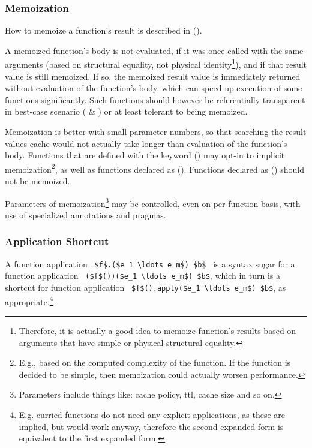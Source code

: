 \subsubsection{Memoization}
\label{sec:memoization}

How to memoize a function's result is described in ().

A memoized function's body is not evaluated, if it was once called with the same arguments (based on structural equality, not physical identity\footnote{Therefore, it is actually a good idea to memoize function's results based on arguments that have simple or physical structural equality.}), and if that result value is still memoized. If so, the memoized result value is immediately returned without evaluation of the function's body, which can speed up execution of some functions significantly. Such functions should however be referentially transparent in best-case scenario ( \& ) or at least tolerant to being memoized. 

Memoization is better with small parameter numbers, so that searching the result values cache would not actually take longer than evaluation of the function's body. Functions that are defined with the  keyword () may opt-in to implicit memoization\footnote{E.g., based on the computed complexity of the function. If the function is decided to be simple, then memoization could actually worsen performance.}, as well as functions declared as  (). Functions declared as  () should not be memoized. 

Parameters of memoization\footnote{Parameters include things like: cache policy, ttl, cache size and so on.} may be controlled, even on per-function basis, with use of specialized annotations and pragmas. 





\subsubsection{Application Shortcut}
\label{sec:function-application-shortcut}

A function application ~\lstinline!$f$.($e_1 \ldots e_m$) $b$!~ is a syntax sugar for a function application ~\lstinline!($f$())($e_1 \ldots e_m$) $b$!, which in turn is a shortcut for function application ~\lstinline!$f$().apply($e_1 \ldots e_m$) $b$!, as appropriate.\footnote{E.g. curried functions do not need any explicit  applications, as these are implied, but would work anyway, therefore the second expanded form is equivalent to the first expanded form.}

